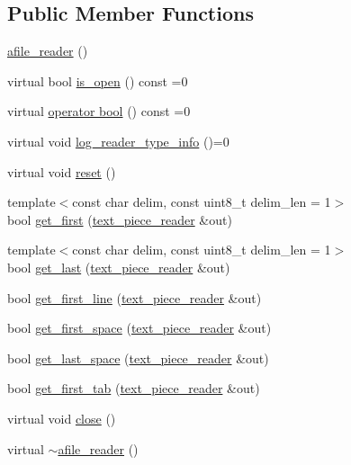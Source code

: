 \subsection*{Public Member Functions}
\begin{DoxyCompactItemize}
\item 
\hyperlink{classuva_1_1utils_1_1file_1_1afile__reader_a6e1b66c4817afcee1506545cd1e49799}{afile\+\_\+reader} ()
\item 
virtual bool \hyperlink{classuva_1_1utils_1_1file_1_1afile__reader_ac54a5e7b729f2801ddf9497e80b1174d}{is\+\_\+open} () const  =0
\item 
virtual \hyperlink{classuva_1_1utils_1_1file_1_1afile__reader_a767f8631cf08f1bbbb381585a55ce3a1}{operator bool} () const  =0
\item 
virtual void \hyperlink{classuva_1_1utils_1_1file_1_1afile__reader_a9054122b644496eee40239c09a53120c}{log\+\_\+reader\+\_\+type\+\_\+info} ()=0
\item 
virtual void \hyperlink{classuva_1_1utils_1_1file_1_1afile__reader_a09e51557725abdd3c8b1a4e5c0115e3f}{reset} ()
\item 
{\footnotesize template$<$const char delim, const uint8\+\_\+t delim\+\_\+len = 1$>$ }\\bool \hyperlink{classuva_1_1utils_1_1file_1_1afile__reader_a6505350ace9f25abe4ae145b29aef7dc}{get\+\_\+first} (\hyperlink{classuva_1_1utils_1_1file_1_1text__piece__reader}{text\+\_\+piece\+\_\+reader} \&out)
\item 
{\footnotesize template$<$const char delim, const uint8\+\_\+t delim\+\_\+len = 1$>$ }\\bool \hyperlink{classuva_1_1utils_1_1file_1_1afile__reader_a0b4e10500c30754d0c2b965a847336fb}{get\+\_\+last} (\hyperlink{classuva_1_1utils_1_1file_1_1text__piece__reader}{text\+\_\+piece\+\_\+reader} \&out)
\item 
bool \hyperlink{classuva_1_1utils_1_1file_1_1afile__reader_a444f47e3f4eb5a09785c8dcde0cf2dec}{get\+\_\+first\+\_\+line} (\hyperlink{classuva_1_1utils_1_1file_1_1text__piece__reader}{text\+\_\+piece\+\_\+reader} \&out)
\item 
bool \hyperlink{classuva_1_1utils_1_1file_1_1afile__reader_a9d520ae06b43166259a3fef3c73fd4f2}{get\+\_\+first\+\_\+space} (\hyperlink{classuva_1_1utils_1_1file_1_1text__piece__reader}{text\+\_\+piece\+\_\+reader} \&out)
\item 
bool \hyperlink{classuva_1_1utils_1_1file_1_1afile__reader_a175a86e7075d481a896246aadec4c94f}{get\+\_\+last\+\_\+space} (\hyperlink{classuva_1_1utils_1_1file_1_1text__piece__reader}{text\+\_\+piece\+\_\+reader} \&out)
\item 
bool \hyperlink{classuva_1_1utils_1_1file_1_1afile__reader_ad6a72cff116d69f406b0f797499f54e0}{get\+\_\+first\+\_\+tab} (\hyperlink{classuva_1_1utils_1_1file_1_1text__piece__reader}{text\+\_\+piece\+\_\+reader} \&out)
\item 
virtual void \hyperlink{classuva_1_1utils_1_1file_1_1afile__reader_af1df62ad9dd43f8be372766a8ca766ff}{close} ()
\item 
virtual \hyperlink{classuva_1_1utils_1_1file_1_1afile__reader_a6807f16bdd129d135e68699f4d26f757}{$\sim$afile\+\_\+reader} ()
\end{DoxyCompactItemize}
